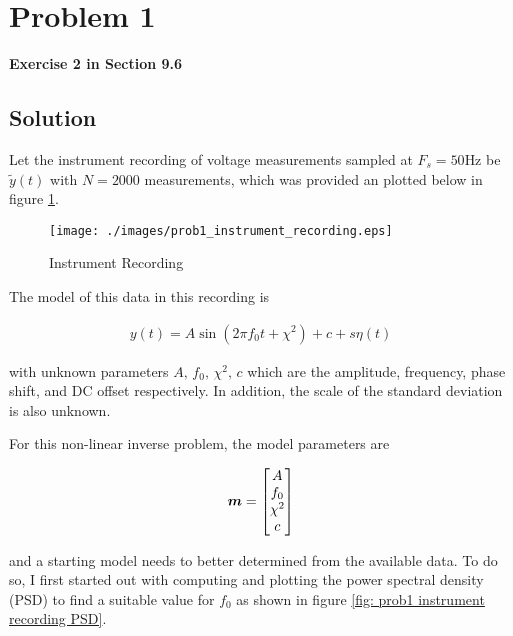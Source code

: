 
\begingroup
\allowdisplaybreaks

\newpage
\section{Problem 1}

\textbf{Exercise 2 in Section 9.6}

\subsection{Solution}

Let the instrument recording of voltage measurements sampled at $F_s = 50 \unit{\hertz}$ be $\tilde{y}\left(t\right)$ with $N = 2000$ measurements, which was provided an plotted below in figure \ref{fig: prob1 instrument recording}.

\begin{figure}[h] 
	\centering
	\texttt{[image: ./images/prob1\_instrument\_recording.eps]}
	\caption{Instrument Recording}
	\label{fig: prob1 instrument recording}
\end{figure}
\FloatBarrier

The model of this data in this recording is

\begin{align*}
	y(t) = A \sin\left( 2 \pi f_0 t + \chi^2 \right) + c + s\eta\left( t \right)
\end{align*}

with unknown parameters $A,\,f_0,\,\chi^2,\,c$ which are the amplitude, frequency, phase shift, and DC offset respectively. In addition, the scale of the standard deviation is also unknown. 

For this non-linear inverse problem, the model parameters are 

\begin{align*}
	\boldsymbol{m} = \begin{bmatrix} A \\ f_0 \\ \chi^2 \\ c \end{bmatrix}
\end{align*}

and a starting model needs to better determined from the available data. To do so, I first started out with computing and plotting the power spectral density (PSD) to find a suitable value for $f_0$ as shown in figure \ref{fig: prob1 instrument recording PSD}. 

